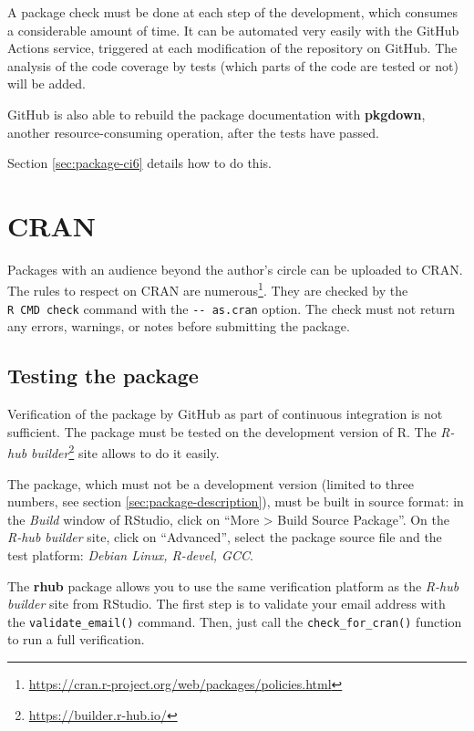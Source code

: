 \documentclass[
  12pt,
  american,
  a4paper,
  extrafontsizes,onecolumn,openright
  ]{memoir}
\begin{document}
A package check must be done at each step of the development, which consumes a considerable amount of time.
It can be automated very easily with the GitHub Actions service, triggered at each modification of the repository on GitHub.
The analysis of the code coverage by tests (which parts of the code are tested or not) will be added.

GitHub is also able to rebuild the package documentation with \textbf{pkgdown}, another resource-consuming operation, after the tests have passed.

Section \ref{sec:package-ci6} details how to do this.

\hypertarget{sec:package-cran}{%
\section{CRAN}\label{sec:package-cran}}

Packages with an audience beyond the author's circle can be uploaded to CRAN.
The rules to respect on CRAN are numerous\footnote{\url{https://cran.r-project.org/web/packages/policies.html}}. They are checked by the \texttt{R\ CMD\ check} command with the \texttt{-\/-\ as.cran} option.
The check must not return any errors, warnings, or notes before submitting the package.

\hypertarget{testing-the-package}{%
\subsection{Testing the package}\label{testing-the-package}}

Verification of the package by GitHub as part of continuous integration is not sufficient.
The package must be tested on the development version of R.
The \emph{R-hub builder}\footnote{\url{https://builder.r-hub.io/}} site allows to do it easily.

The package, which must not be a development version (limited to three numbers, see section \ref{sec:package-description}), must be built in source format: in the \emph{Build} window of RStudio, click on \enquote{More \textgreater{} Build Source Package}.
On the \emph{R-hub builder} site, click on \enquote{Advanced}, select the package source file and the test platform: \emph{Debian Linux, R-devel, GCC}.

The \textbf{rhub} package allows you to use the same verification platform as the \emph{R-hub builder} site from RStudio.
The first step is to validate your email address with the \texttt{validate\_email()} command.
Then, just call the \texttt{check\_for\_cran()} function to run a full verification.
\end{document}
